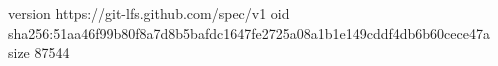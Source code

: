 version https://git-lfs.github.com/spec/v1
oid sha256:51aa46f99b80f8a7d8b5bafdc1647fe2725a08a1b1e149cddf4db6b60cece47a
size 87544
